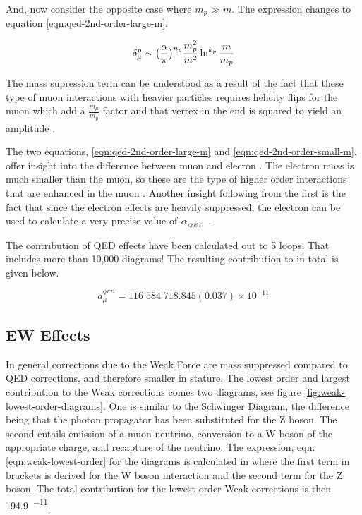 \noindent
And, now consider the opposite case where $m_p \gg m$.  The expression changes to equation \ref{eqn:qed-2nd-order-large-m}.

\begin{equation}
\label{eqn:qed-2nd-order-large-m}
\delta_\mu^p \sim \big(\frac{\alpha}{\pi} \big)^{n_p} \\
\frac{m_p^2}{m^2} \ln^{k_p}\frac{m}{m_p}
\end{equation}

\noindent
The mass supression term can be understood as a result of the fact that these type of muon interactions with heavier particles requires helicity flips for the muon which add a $\frac{m_\mu}{m_p}$ factor and that vertex in the end is squared to yield an amplitude \cite{amm-of-muon}.

The two equations, \ref{eqn:qed-2nd-order-large-m} and \ref{eqn:qed-2nd-order-small-m}, offer insight into the difference between muon and elecron \gmtwo.  The electron mass is much smaller than the muon, so these are the type of higher order interactions that are enhanced in the muon \gmtwo.  Another insight following from the first is the fact that since the electron effects are heavily suppressed, the electron \gmtwo can be used to calculate a very precise value of $\alpha_{_{QED}}$ \cite{amm-of-muon}.

The contribution of QED effects have been calculated out to 5 loops\cite{5-loop-qed}.  That includes more than 10,000 diagrams!  The resulting contribution to \mugmtwo in total is given below.

\begin{equation}
\label{eqn:qed-total}
a_\mu^{^{QED}} = 116\;584\;718.845(0.037) \times 10^{-11}
\end{equation}

\subsection{EW Effects} \label{s-sec:theory-ew}

In general corrections due to the Weak Force are mass suppressed compared to QED corrections, and therefore smaller in stature.  The lowest order and largest contribution to the Weak corrections comes two diagrams, see figure \ref{fig:weak-lowest-order-diagrams}. One is similar to the Schwinger Diagram, the difference being that the photon propagator has been substituted for the Z boson.  The second entails emission of a muon neutrino, conversion to a W boson of the appropriate charge, and recapture of the neutrino.  The expression, eqn. \ref{eqn:weak-lowest-order} for the diagrams is calculated in\cite{the-muon-g-2} where the first term in brackets is derived for the W boson interaction and the second term for the Z boson.  The total contribution for the lowest order Weak corrections is then \SI{194.9}{^{-11}}.

